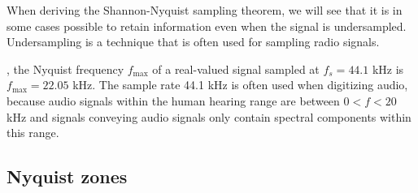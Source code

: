 When deriving the Shannon-Nyquist sampling theorem, we will see that it is in some cases 
possible to retain information even when the signal is undersampled. 
Undersampling is a technique that is often used for sampling radio signals.

, the Nyquist frequency $f_{\mathrm{max}}$ of a real-valued 
signal sampled at $f_s=44.1$ kHz is $f_{\mathrm{max}}=22.05$ kHz. 
The sample rate 44.1 kHz is often used when digitizing audio, because audio signals 
within the human hearing range are between $0<f<20$ kHz and signals conveying audio 
signals only contain spectral components within this range.

\subsection{Nyquist zones}
